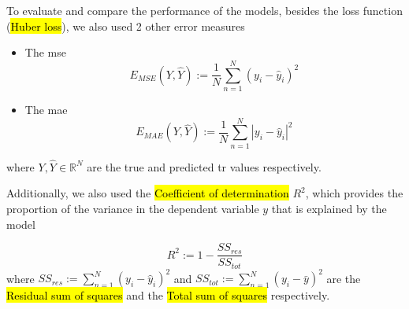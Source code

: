 
\glsresetall
\graphicspath{{./Sections/Methodology/Resources/}}

To evaluate and compare the performance of the models, besides the loss function (\hl{Huber loss}), we also used 2 other error measures

\begin{itemize}
  \item The \acrfull{mse}
    \begin{equation}
      E_{MSE}(Y,\hat{Y}) := \frac{1}{N} \sum_{n=1}^N (y_i-\hat{y}_i)^2
    \end{equation}
  \item The \acrfull{mae}
    \begin{equation}
      E_{MAE}(Y,\hat{Y}) := \frac{1}{N} \sum_{n=1}^N |y_i-\hat{y}_i|^2
    \end{equation}
\end{itemize}

\noindent where $Y, \hat{Y} \in \mathbb{R}^N$ are the true and predicted \gls{tr} values respectively.

Additionally, we also used the \hl{Coefficient of determination} $R^2$, which provides the proportion of the variance in the dependent variable $y$ that is explained by the model \cite{steel1960principles}

\begin{equation}
    R^2 := 1 - \frac{SS_{res}}{SS_{tot}}
\end{equation}
\noindent where $SS_{res}:=\sum_{n=1}^N (y_i-\hat{y}_i)^2$ and $SS_{tot}:=\sum_{n=1}^N (y_i-\bar{y})^2$ are the \hl{Residual sum of squares} and the \hl{Total sum of squares} respectively.
